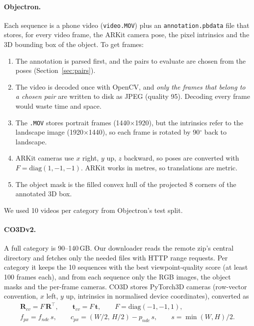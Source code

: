 \documentclass[11pt,a4paper]{article}
\newcommand{\R}{\mathbf{R}}
\newcommand{\tv}{\mathbf{t}}
\begin{document}
\paragraph{Objectron.} Each sequence is a phone video (\texttt{video.MOV}) plus an
\texttt{annotation.pbdata} file that stores, for every video frame, the ARKit camera pose,
the pixel intrinsics and the 3D bounding box of the object. To get frames:
\begin{enumerate}
  \item The annotation is parsed first, and the pairs to evaluate are chosen from the poses
        (Section~\ref{sec:pairs}).
  \item The video is decoded once with OpenCV, and \emph{only the frames that belong to a chosen
        pair} are written to disk as JPEG (quality 95). Decoding every frame would waste time and space.
  \item The \texttt{.MOV} stores portrait frames (1440$\times$1920), but the intrinsics refer to
        the landscape image (1920$\times$1440), so each frame is rotated by 90$^\circ$ back to landscape.
  \item ARKit cameras use $x$ right, $y$ up, $z$ backward, so poses are converted with
        $F=\mathrm{diag}(1,-1,-1)$. ARKit works in metres, so translations are metric.
  \item The object mask is the filled convex hull of the projected 8 corners of the annotated 3D box.
\end{enumerate}
We used 10 videos per category from Objectron's test split.

\paragraph{CO3Dv2.} A full category is 90--140\,GB. Our downloader reads the remote zip's
central directory and fetches only the needed files with HTTP range requests. Per category it keeps the 10
sequences with the best viewpoint-quality score (at least 100 frames each), and from each
sequence only the RGB images, the object masks and the per-frame cameras. CO3D stores
PyTorch3D cameras (row-vector convention, $x$ left, $y$ up, intrinsics in normalised device
coordinates), converted as
\begin{gather}
  \R_{cv} = F\,\R^\top,\qquad \tv_{cv} = F\,\tv,\qquad F=\mathrm{diag}(-1,-1,1),\\
  f_{px} = f_{ndc}\,s,\qquad c_{px} = (W/2,\,H/2) - p_{ndc}\,s,\qquad s=\min(W,H)/2 .
\end{gather}
\end{document}
